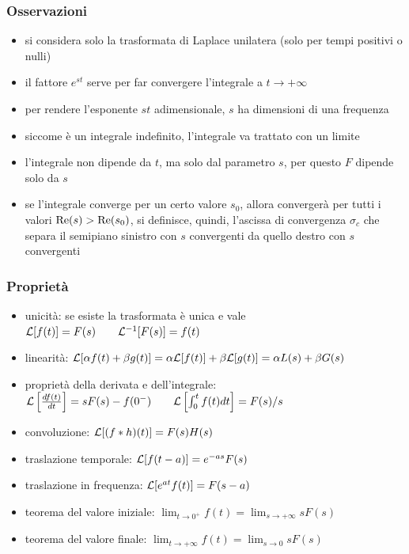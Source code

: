 \subsubsection*{Osservazioni}
\begin{itemize}
	\item si considera solo la trasformata di Laplace unilatera (solo per tempi positivi o nulli)
	\item il fattore \(e^{st}\) serve per far convergere l'integrale a \(t \to +\infty\)
	\item per rendere l'esponente \(st\) adimensionale, \(s\) ha dimensioni di una frequenza
	\item siccome è un integrale indefinito, l'integrale va trattato con un limite
	\item l'integrale non dipende da \(t\), ma solo dal parametro \(s\), per questo \(F\) dipende solo da \(s\)
	\item se l'integrale converge per un certo valore \(s_0\), allora convergerà per tutti i valori \(\text{Re}(s) > \text{Re}(s_0)\), si 
	definisce, quindi, l'ascissa di convergenza \(\sigma_c\) che separa il semipiano sinistro con \(s\) convergenti da quello
	destro con \(s\) convergenti
\end{itemize}

\subsubsection*{Proprietà}
\begin{itemize}
	\item unicità: se esiste la trasformata è unica e vale \(\mathcal{L}[f(t)] = F(s) \qquad \mathcal{L}^{-1}[F(s)] = f(t)\)
	\item linearità: \(\mathcal{L}[\alpha f(t) + \beta g(t)] = \alpha\mathcal{L}[f(t)] + \beta\mathcal{L}[g(t)] = \alpha L(s) + \beta G(s)\)
	\item proprietà della derivata e dell'integrale: \(\mathcal{L}\left[\frac{d f(t)}{dt}\right] = sF(s) - f(0^-) \qquad \mathcal{L}\left[\int_0^t f(t) dt \right] = F(s)/s\)
	\item convoluzione: \(\mathcal{L}[(f*h)(t)] = F(s)H(s)\)
	\item traslazione temporale: \(\mathcal{L}[f(t-a)] = e^{-as} F(s)\)
	\item traslazione in frequenza: \(\mathcal{L}[e^{at}f(t)] = F(s-a)\)
	\item teorema del valore iniziale: \(\displaystyle \lim_{t \to 0^+} f(t) = \lim_{s \to +\infty} sF(s)\)
	\item teorema del valore finale: \(\displaystyle \lim_{t \to +\infty} f(t) = \lim_{s \to 0} sF(s)\)
\end{itemize}

